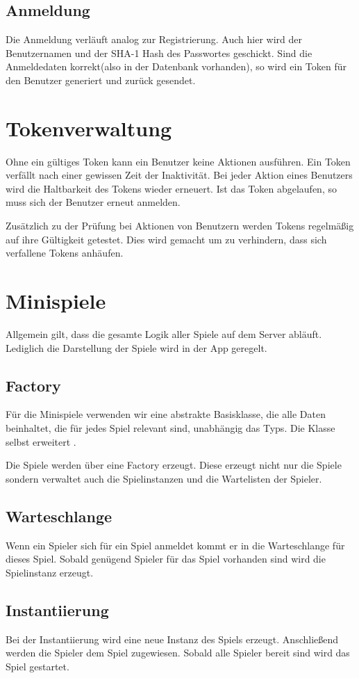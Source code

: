 \subsection{Anmeldung}
Die Anmeldung verläuft analog zur Registrierung. Auch hier wird der Benutzernamen und der SHA-1 Hash des Passwortes geschickt. Sind die Anmeldedaten korrekt(also in der Datenbank vorhanden), so wird ein Token für den Benutzer generiert und zurück gesendet.

\section{Tokenverwaltung}
Ohne ein gültiges Token kann ein Benutzer keine Aktionen ausführen. Ein Token verfällt nach einer gewissen Zeit der Inaktivität. Bei jeder Aktion eines Benutzers wird die Haltbarkeit des Tokens wieder erneuert. Ist das Token abgelaufen, so muss sich der Benutzer erneut anmelden.

Zusätzlich zu der Prüfung bei Aktionen von Benutzern werden Tokens regelmäßig auf ihre Gültigkeit getestet. Dies wird gemacht um zu verhindern, dass sich verfallene Tokens anhäufen.

\section{Minispiele}
Allgemein gilt, dass die gesamte Logik aller Spiele auf dem Server abläuft. Lediglich die Darstellung der Spiele wird in der App geregelt.

\subsection{Factory}
Für die Minispiele verwenden wir eine abstrakte Basisklasse, die alle Daten beinhaltet, die für jedes Spiel relevant sind, unabhängig das Typs. Die Klasse selbst erweitert .

Die Spiele werden über eine Factory erzeugt. Diese erzeugt nicht nur die Spiele sondern verwaltet auch die Spielinstanzen und die Wartelisten der Spieler. 

\subsection{Warteschlange}
Wenn ein Spieler sich für ein Spiel anmeldet kommt er in die Warteschlange für dieses Spiel. Sobald genügend Spieler für das Spiel vorhanden sind wird die Spielinstanz erzeugt.

\subsection{Instantiierung}
Bei der Instantiierung wird eine neue Instanz des Spiels erzeugt. Anschließend werden die Spieler dem Spiel zugewiesen. Sobald alle Spieler bereit sind wird das Spiel gestartet.

